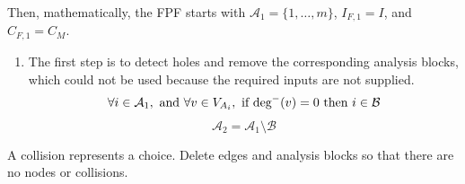 Then, mathematically, the FPF starts with $\mathcal A_1 = \{1,\ldots,m\}$, $I_{F,1} = I$, and $C_{F,1} = C_M$.



\begin{enumerate}
\item The first step is to detect holes and remove the corresponding analysis blocks, which could not be used because the required inputs are not supplied.
\begin{equation}
\forall i \in \mathcal A_1,\textrm{ and }\forall v \in V_{A_i},\textrm{ if deg}^-(v)=0 \textrm{ then } i \in \mathcal B
\end{equation}
\begin{equation}
\mathcal A_2 = \mathcal A_1 \setminus \mathcal B
\end{equation}
\end{enumerate}

A collision represents a choice.
Delete edges and analysis blocks so that there are no nodes or collisions.





